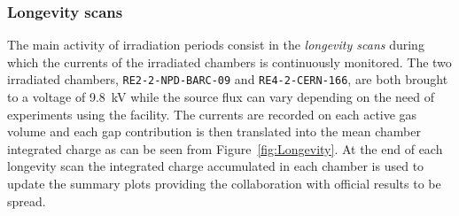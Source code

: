 		\subsubsection{Longevity scans}
		\label{chapt5:sssec:longscan}
	
	The main activity of irradiation periods consist in the \textit{longevity scans} during which the currents of the irradiated chambers is continuously monitored. The two irradiated chambers, \texttt{RE2-2-NPD-BARC-09} and \texttt{RE4-2-CERN-166}, are both brought to a voltage of \SI{9.8}{kV} while the source flux can vary depending on the need of experiments using the facility. The currents are recorded on each active gas volume and each gap contribution is then translated into the mean chamber integrated charge as can be seen from Figure~\ref{fig:Longevity}. At the end of each longevity scan the integrated charge accumulated in each chamber is used to update the summary plots providing the collaboration with official results to be spread.
	
